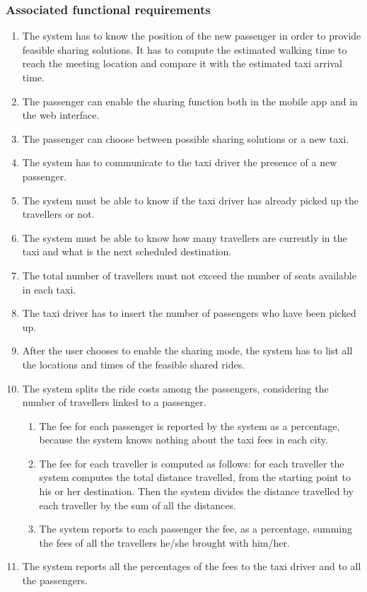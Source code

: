 \subsubsection{Associated functional requirements}
\begin{enumerate}
	\item The system has to know the position of the new passenger in order to provide feasible sharing solutions.
	It has to compute the estimated walking time to reach the meeting location and compare it with the estimated taxi arrival time.
	\item The passenger can enable the sharing function both in the mobile app and in the web interface.
	\item The passenger can choose between possible sharing solutions or a new taxi.
	\item The system has to communicate to the taxi driver the presence of a new passenger.
	\item The system must be able to know if the taxi driver has already picked up the travellers or not.
	\item The system must be able to know how many travellers are currently in the taxi and what is the next scheduled destination.
	\item The total number of travellers must not exceed the number of seats available in each taxi.
	\item The taxi driver has to insert the number of passengers who have been picked up.
	\item After the user chooses to enable the sharing mode, the system has to list all the locations and times of the feasible shared rides.
	\item The system splits the ride costs among the passengers, considering the number of travellers linked to a passenger.
	\begin{enumerate}
		\item The fee for each passenger is reported by the system as a percentage, because the system knows nothing about the taxi fees in each city.
		\item The fee for each traveller is computed as follows: for each traveller the system computes the total distance travelled, from the starting point to his or her destination. Then the system divides the distance travelled by each traveller by the sum of all the distances.
		\item The system reports to each passenger the fee, as a percentage, summing the fees of all the travellers he/she brought with him/her.
	\end{enumerate}
	\item The system reports all the percentages of the fees to the taxi driver and to all the passengers.
\end{enumerate}
